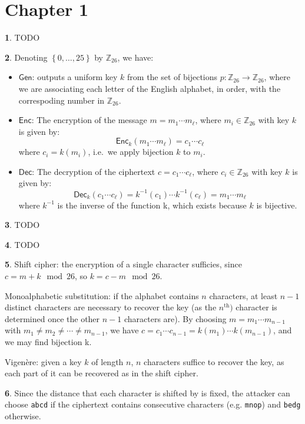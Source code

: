 \documentclass{article}
\theoremstyle{definition}
\newcommand{\bb}[1]{\mathbb{#1}}
\newcommand{\Z}{\bb{Z}}
\newcommand{\set}[1]{\left\{#1\right\}}
\newcommand{\Gen}{\mathsf{Gen}}
\newcommand{\Enc}{\mathsf{Enc}}
\newcommand{\Dec}{\mathsf{Dec}}
\theoremstyle{definition}
\theoremstyle{definition}
\newtheorem{solution-internal}{}[subsection]
\newenvironment{solution}{
  \begin{solution-internal}
}{
  \end{solution-internal}
}
\begin{document}
\section*{Chapter 1}
\setcounter{section}{1}
\setcounter{subsection}{1}

\begin{solution}
  TODO
\end{solution}

\begin{solution}
  Denoting $\set{0, \dots, 25}$ by $\Z_{26}$, we have:
  \begin{itemize}
    \item $\Gen$: outputs a uniform key $k$ from the set of bijections
      $p\colon\Z_{26} \to \Z_{26}$, where we are associating each letter of the
      English alphabet, in order, with the correspoding number in $\Z_{26}$.
    \item $\Enc$: The encryption of the message $m = m_1\cdots m_{\ell}$, where
      $m_i \in \Z_{26}$ with key $k$ is given by:
      \[ \Enc_k(m_1 \cdots m_{\ell}) = c_1 \cdots c_{\ell}\]
      where $c_i = k(m_i)$, i.e.\ we apply bijection $k$ to $m_i$.
    \item $\Dec$: The decryption of the ciphertext $c = c_1 \cdots c_{\ell}$,
      where $c_i \in \Z_{26}$ with key $k$ is given by:
      \[ \Dec_k(c_1 \cdots c_{\ell}) = k^{-1}(c_1) \cdots k^{-1}(c_{\ell}) = m_1 \cdots
      m_{\ell}\]
      where $k^{-1}$ is the inverse of the function k, which exists because $k$
      is bijective.
  \end{itemize}
\end{solution}

\begin{solution}
  TODO
\end{solution}

\begin{solution}
  TODO
\end{solution}

\begin{solution}
  Shift cipher: the encryption of a single character sufficies, since $c = m +
  k \mod 26$, so $k = c - m \mod 26$.
  
  Monoalphabetic substitution: if the alphabet contains $n$ characters, at least
  $n-1$ distinct characters are necessary to recover the key (as the
  $n^{\text{th}})$ character is determined once the other $n-1$ characters are).
  By choosing $m = m_1 \cdots m_{n - 1}$ with $m_1 \neq m_2 \neq \cdots \neq m_{n-1}$, we have $c = c_1 \cdots c_{n-1} = k(m_1) \cdots k(m_{n-1})$, and we may find bijection k.

  Vigenère: given a key $k$ of length $n$, $n$ characters suffice to recover the
  key, as each part of it can be recovered as in the shift cipher.
\end{solution}
\begin{solution}
  Since the distance that each character is shifted by is fixed, the attacker
  can choose {\tt abcd} if the ciphertext contains consecutive characters (e.g.
  {\tt mnop}) and {\tt bedg} otherwise.
\end{solution}
\end{document}
